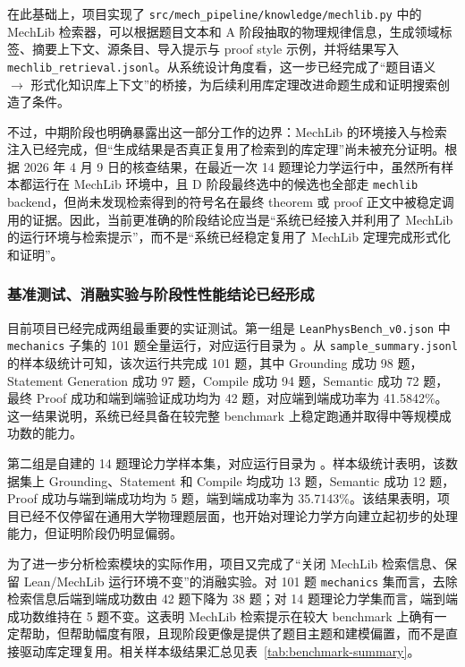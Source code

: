 \documentclass[12pt,a4paper]{ctexart}
\begin{document}
在此基础上，项目实现了 \texttt{src/mech\_pipeline/knowledge/mechlib.py} 中的 MechLib 检索器，可以根据题目文本和 A 阶段抽取的物理规律信息，生成领域标签、摘要上下文、源条目、导入提示与 proof style 示例，并将结果写入 \texttt{mechlib\_retrieval.jsonl}。从系统设计角度看，这一步已经完成了“题目语义 $\rightarrow$ 形式化知识库上下文”的桥接，为后续利用库定理改进命题生成和证明搜索创造了条件。

不过，中期阶段也明确暴露出这一部分工作的边界：MechLib 的环境接入与检索注入已经完成，但“生成结果是否真正复用了检索到的库定理”尚未被充分证明。根据 2026 年 4 月 9 日的核查结果，在最近一次 14 题理论力学运行中，虽然所有样本都运行在 MechLib 环境中，且 D 阶段最终选中的候选也全部走 \texttt{mechlib} backend，但尚未发现检索得到的符号名在最终 theorem 或 proof 正文中被稳定调用的证据。因此，当前更准确的阶段结论应当是“系统已经接入并利用了 MechLib 的运行环境与检索提示”，而不是“系统已经稳定复用了 MechLib 定理完成形式化和证明”。

\subsubsection{基准测试、消融实验与阶段性性能结论已经形成}

目前项目已经完成两组最重要的实证测试。第一组是 \texttt{LeanPhysBench\_v0.json} 中 \texttt{mechanics} 子集的 101 题全量运行，对应运行目录为 。从 \texttt{sample\_summary.jsonl} 的样本级统计可知，该次运行共完成 101 题，其中 Grounding 成功 98 题，Statement Generation 成功 97 题，Compile 成功 94 题，Semantic 成功 72 题，最终 Proof 成功和端到端验证成功均为 42 题，对应端到端成功率为 41.5842\%。这一结果说明，系统已经具备在较完整 benchmark 上稳定跑通并取得中等规模成功数的能力。

第二组是自建的 14 题理论力学样本集，对应运行目录为 。样本级统计表明，该数据集上 Grounding、Statement 和 Compile 均成功 13 题，Semantic 成功 12 题，Proof 成功与端到端成功均为 5 题，端到端成功率为 35.7143\%。该结果表明，项目已经不仅停留在通用大学物理题层面，也开始对理论力学方向建立起初步的处理能力，但证明阶段仍明显偏弱。

为了进一步分析检索模块的实际作用，项目又完成了“关闭 MechLib 检索信息、保留 Lean/MechLib 运行环境不变”的消融实验。对 101 题 \texttt{mechanics} 集而言，去除检索信息后端到端成功数由 42 题下降为 38 题；对 14 题理论力学集而言，端到端成功数维持在 5 题不变。这表明 MechLib 检索提示在较大 benchmark 上确有一定帮助，但帮助幅度有限，且现阶段更像是提供了题目主题和建模偏置，而不是直接驱动库定理复用。相关样本级结果汇总见表~\ref{tab:benchmark-summary}。
\end{document}
